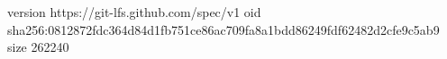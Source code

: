 version https://git-lfs.github.com/spec/v1
oid sha256:0812872fdc364d84d1fb751ce86ac709fa8a1bdd86249fdf62482d2cfe9c5ab9
size 262240
